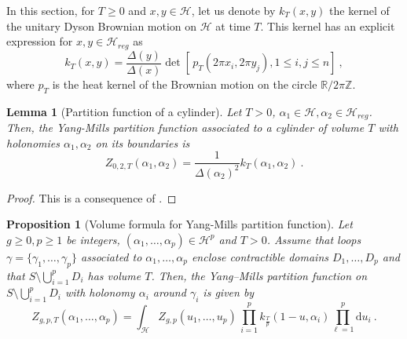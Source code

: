 \documentclass[11pt,a4paper]{amsart}
\providecommand{\diff}{\mathrm d}
\numberwithin{equation}{section}
\newtheorem{proposition}[theorem]{Proposition}
\newtheorem{lemma}[theorem]{Lemma}
\theoremstyle{definition}
\begin{document}
\noindent
In this section, 
for $T \geqslant 0$ and $x,y \in \mathcal{H}$, let us denote by $k_T(x,y)$ the kernel of the unitary Dyson Brownian motion on $\mathcal{H}$ at time $T$. This kernel has an explicit expression for $x,y\in\mathcal{H}_{reg}$ as 
\begin{equation}\label{eq:kernel_brownian}
k_{T}(x,y)=\frac{\Delta(y)}{\Delta(x)}\det \left[ \,p_T(2\pi x_i,2\pi y_j),1\leqslant i,j\leqslant n\right] \ ,
\end{equation}
where $p_{T}$ is the heat kernel of the Brownian motion on the circle $\mathbb{R}/2\pi \mathbb{Z}$.

\begin{lemma}[Partition function of a cylinder]
    Let $T > 0$, $\alpha_1\in\mathcal{H},\alpha_2 \in \mathcal{H}_{reg}$. Then, the Yang-Mills partition function associated to a cylinder of volume $T$ with holonomies $\alpha_1,\alpha_2$ on its boundaries is
    \begin{equation*}
        Z_{0, 2, T}(\alpha_1, \alpha_2) =\frac{1}{\Delta(\alpha_2)^2} k_T(\alpha_1,\alpha_2) \ .
    \end{equation*}
\end{lemma}

\begin{proof}
    This is a consequence of \cite[Proposition 4.2.4 and $(5.3)$]{levy2003yang}.
\end{proof}

\begin{proposition}[Volume formula for Yang-Mills partition function]\label{prop:volume_formula_yang_mills}
    Let $ g \geqslant 0,p\geqslant 1$ be integers, $(\alpha_1, \dots, \alpha_p) \in \mathcal{H}^p$ 
    and $T > 0$. Assume that loops $\gamma=\{\gamma_1,\ldots,\gamma_p\}$ associated to $\alpha_1, \dots, \alpha_p$ enclose contractible domains $D_1,\ldots,D_p$ and that $S\setminus \bigcup_{i=1}^pD_i$ has volume $T$. Then, the Yang--Mills partition function on $S\setminus \bigcup_{i=1}^pD_i$ with holonomy $\alpha_i$ around $\gamma_i$ is given by 
    \begin{equation*}
        Z_{g,p, T}(\alpha_1, \dots, \alpha_p) 
        =\int_{\mathcal{H}} Z_{g, p}(u_1, \dots, u_p) \, 
        \prod_{i=1}^pk_{\frac{T}{p}}(1-u,\alpha_i)  \prod_{\ell=1}^p\diff u_i  \ .
    \end{equation*}
\end{proposition}
\end{document}

